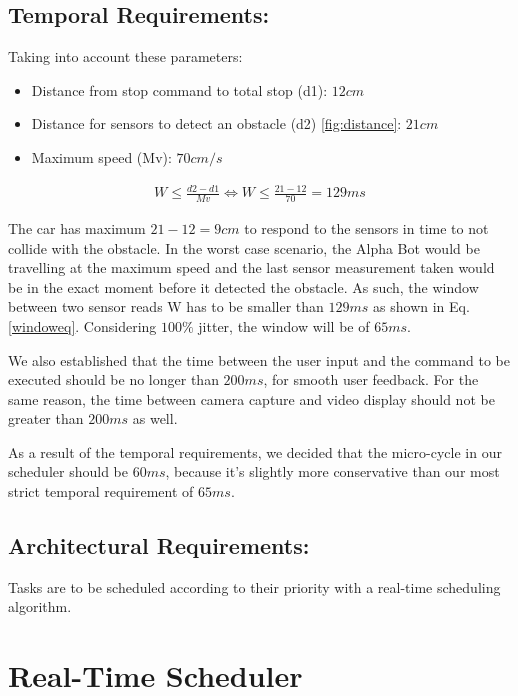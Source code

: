 \documentclass[conference]{IEEEtran}
\begin{document}
\subsection{Temporal Requirements:}

Taking into account these parameters:

\begin{itemize}
    \item Distance from stop command to total stop (d1): $12cm$
    \item Distance for sensors to detect an obstacle (d2) \ref{fig:distance}: $21cm$
    \item Maximum speed (Mv): $70 cm/s$
\end{itemize}

\begin{equation}
    \begin{aligned}
        W \leq \frac{d2 - d1}{Mv} \iff W \leq \frac{21 - 12}{70} = 129 ms \label{windoweq}
    \end{aligned}
\end{equation}

The car has maximum $21-12=9cm$ to respond to the sensors in time to not collide with the obstacle. In the worst case scenario, the Alpha Bot would be travelling at the maximum speed and the last sensor measurement taken would be in the exact moment before it detected the obstacle. As such, the window between two sensor reads W has to be smaller than $129ms$ as shown in Eq. \eqref{windoweq}. Considering $100\%$ jitter, the window will be of $65ms$.

We also established that the time between the user input and the command to be executed should be no longer than $200ms$, for smooth user feedback. For the same reason, the time between camera capture and video display should not be greater than $200ms$ as well.

As a result of the temporal requirements, we decided that the micro-cycle in our scheduler should be $60ms$, because it's slightly more conservative than our most strict temporal requirement of $65ms$.

\subsection{Architectural Requirements:}
Tasks are to be scheduled according to their priority with a real-time scheduling algorithm.


\section{Real-Time Scheduler}
\end{document}

